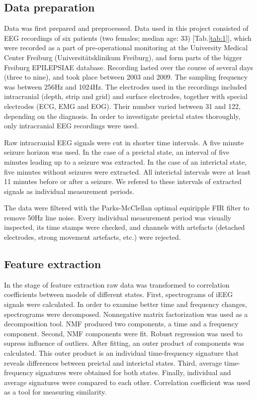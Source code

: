 \documentclass{article}
\begin{document}
\subsection{Data preparation}

Data was first prepared and preprocessed. Data used in this project consisted of EEG recordings of six patients (two females; median age: 33) [Tab.\ref{tab:1}], which were recorded as a part of pre-operational monitoring at the University Medical Center Freiburg (Universit{\"a}tsklinikum Freiburg), and form parts of the bigger Freiburg EPILEPSIAE database.  Recording lasted over the course of several days (three to nine), and took place between 2003 and 2009. The sampling frequency was between 256Hz and 1024Hz. The electrodes used in the recordings included intracranial (depth, strip and grid) and surface electrodes, together with special electrodes (ECG, EMG and EOG). Their number varied between 31 and 122, depending on the diagnosis. In order to investigate preictal states thoroughly, only intracranial EEG recordings were used. 

Raw intracranial EEG signals were cut in shorter time intervals. A five minute seizure horizon was used. In the case of a preictal state, an interval of five minutes leading up to a seizure was extracted. In the case of an interictal state, five minutes without seizures were extracted. All interictal intervals were at least 11 minutes before or after a seizure. We refered to these intervals of extracted signals as individual measurement periods. 

The data were filtered with the Parks-McClellan optimal equiripple FIR filter to remove 50Hz line noise. Every individual measurement period was visually inspected, its time stamps were checked, and channels with artefacts (detached electrodes, strong movement artefacts, etc.) were rejected. 


\subsection{Feature extraction}

In the stage of feature extraction raw data was transformed to correlation coefficients between models of different states. 
First, spectrograms of iEEG signals were calculated. In order to examine better time and frequency changes, spectrograms were decomposed. Nonnegative matrix factorization was used as a decomposition tool. NMF produced two components, a time and a frequency component. 
Second, NMF components were fit. Robust regression was used to supress influence of outliers. After fitting, an outer product of components was calculated. This outer product is an individual time-frequency signature that reveals differences between preictal and interictal states. 
Third, average time-frequency signatures were obtained for both states. 
Finally, individual and average signatures were compared to each other. Correlation coefficient was used as a tool for measuring similarity. 
\end{document}
